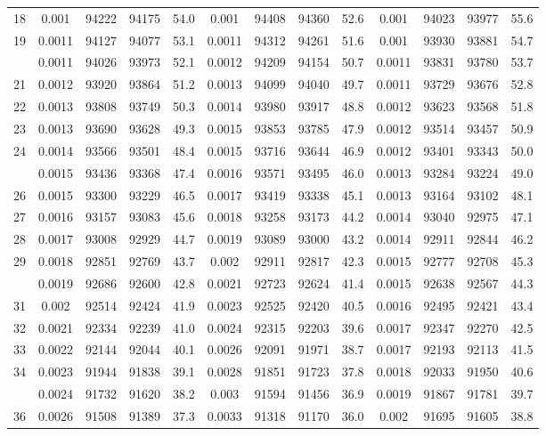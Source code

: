 \documentclass[
  14pt,
]{article}
\begin{document}
\begin{longtable}[t]{lcccccccccccc}
18 & 0.001 & 94222 & 94175 & 54.0 & 0.001 & 94408 & 94360 & 52.6 & 0.001 & 94023 & 93977 & 55.6\\
19 & 0.0011 & 94127 & 94077 & 53.1 & 0.0011 & 94312 & 94261 & 51.6 & 0.001 & 93930 & 93881 & 54.7\\
\addlinespace
20 & 0.0011 & 94026 & 93973 & 52.1 & 0.0012 & 94209 & 94154 & 50.7 & 0.0011 & 93831 & 93780 & 53.7\\
21 & 0.0012 & 93920 & 93864 & 51.2 & 0.0013 & 94099 & 94040 & 49.7 & 0.0011 & 93729 & 93676 & 52.8\\
22 & 0.0013 & 93808 & 93749 & 50.3 & 0.0014 & 93980 & 93917 & 48.8 & 0.0012 & 93623 & 93568 & 51.8\\
23 & 0.0013 & 93690 & 93628 & 49.3 & 0.0015 & 93853 & 93785 & 47.9 & 0.0012 & 93514 & 93457 & 50.9\\
24 & 0.0014 & 93566 & 93501 & 48.4 & 0.0015 & 93716 & 93644 & 46.9 & 0.0012 & 93401 & 93343 & 50.0\\
\addlinespace
25 & 0.0015 & 93436 & 93368 & 47.4 & 0.0016 & 93571 & 93495 & 46.0 & 0.0013 & 93284 & 93224 & 49.0\\
26 & 0.0015 & 93300 & 93229 & 46.5 & 0.0017 & 93419 & 93338 & 45.1 & 0.0013 & 93164 & 93102 & 48.1\\
27 & 0.0016 & 93157 & 93083 & 45.6 & 0.0018 & 93258 & 93173 & 44.2 & 0.0014 & 93040 & 92975 & 47.1\\
28 & 0.0017 & 93008 & 92929 & 44.7 & 0.0019 & 93089 & 93000 & 43.2 & 0.0014 & 92911 & 92844 & 46.2\\
29 & 0.0018 & 92851 & 92769 & 43.7 & 0.002 & 92911 & 92817 & 42.3 & 0.0015 & 92777 & 92708 & 45.3\\
\addlinespace
30 & 0.0019 & 92686 & 92600 & 42.8 & 0.0021 & 92723 & 92624 & 41.4 & 0.0015 & 92638 & 92567 & 44.3\\
31 & 0.002 & 92514 & 92424 & 41.9 & 0.0023 & 92525 & 92420 & 40.5 & 0.0016 & 92495 & 92421 & 43.4\\
32 & 0.0021 & 92334 & 92239 & 41.0 & 0.0024 & 92315 & 92203 & 39.6 & 0.0017 & 92347 & 92270 & 42.5\\
33 & 0.0022 & 92144 & 92044 & 40.1 & 0.0026 & 92091 & 91971 & 38.7 & 0.0017 & 92193 & 92113 & 41.5\\
34 & 0.0023 & 91944 & 91838 & 39.1 & 0.0028 & 91851 & 91723 & 37.8 & 0.0018 & 92033 & 91950 & 40.6\\
\addlinespace
35 & 0.0024 & 91732 & 91620 & 38.2 & 0.003 & 91594 & 91456 & 36.9 & 0.0019 & 91867 & 91781 & 39.7\\
36 & 0.0026 & 91508 & 91389 & 37.3 & 0.0033 & 91318 & 91170 & 36.0 & 0.002 & 91695 & 91605 & 38.8\\

\end{longtable}
\end{document}
